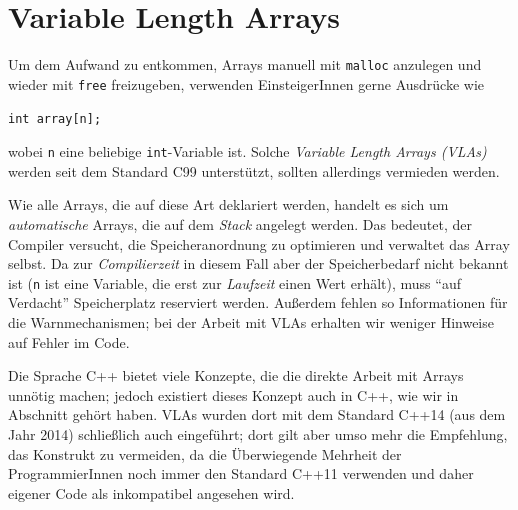 \section{Variable Length Arrays}
Um dem Aufwand zu entkommen, Arrays manuell mit \texttt{malloc} anzulegen und wieder mit \texttt{free} freizugeben, verwenden EinsteigerInnen gerne Ausdrücke wie
\begin{center}
\texttt{int array[n];}
\end{center}
wobei \texttt{n} eine beliebige \texttt{int}-Variable ist. Solche \emph{Variable Length Arrays (VLAs)} werden seit dem Standard C99 unterstützt, sollten allerdings vermieden werden.

Wie alle Arrays, die auf diese Art deklariert werden, handelt es sich um \emph{automatische} Arrays, die auf dem \emph{Stack} angelegt werden. Das bedeutet, der Compiler versucht, die Speicheranordnung zu optimieren und verwaltet das Array selbst. Da zur \emph{Compilierzeit} in diesem Fall aber der Speicherbedarf nicht bekannt ist (\texttt{n} ist eine Variable, die erst zur \emph{Laufzeit} einen Wert erhält), muss \enquote{auf Verdacht} Speicherplatz reserviert werden. Außerdem fehlen so Informationen für die Warnmechanismen; \ie bei der Arbeit mit VLAs erhalten wir weniger Hinweise auf Fehler im Code.

\begin{plusbox}
Die Sprache C++ bietet viele Konzepte, die die direkte Arbeit mit Arrays unnötig machen; jedoch existiert dieses Konzept auch in C++, wie wir in Abschnitt \label{sec:ArrayCPP} gehört haben. VLAs wurden dort mit dem Standard C++14 (aus dem Jahr 2014) schließlich auch eingeführt; dort gilt aber umso mehr die Empfehlung, das Konstrukt zu vermeiden, da die Überwiegende Mehrheit der ProgrammierInnen noch immer den Standard C++11 verwenden und daher eigener Code als inkompatibel angesehen wird.
\end{plusbox}